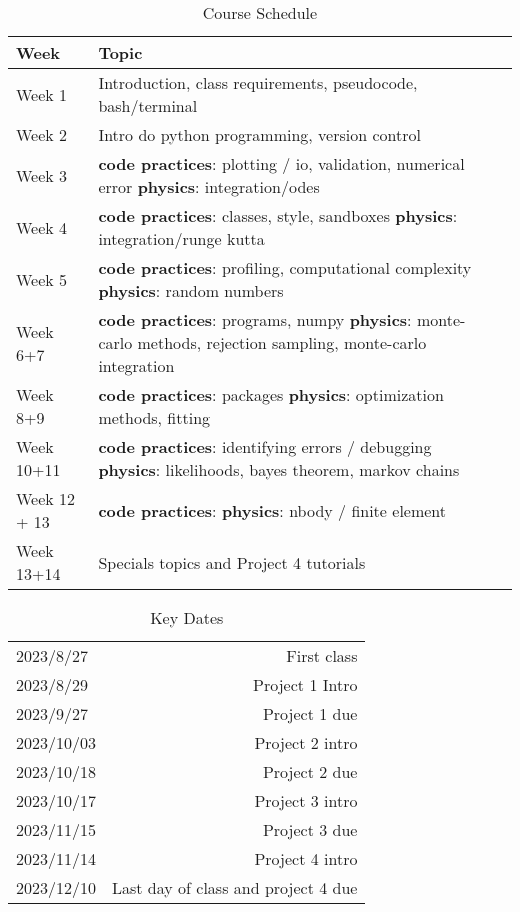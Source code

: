 \documentclass[12pt]{article}
\begin{document}
\begin{table}[h]
  \caption{Course Schedule}
\begin{center}
  \begin{tabular}{|p{3cm}|m{10cm} | @{}m{0pt}@{}}
     \toprule
     \textbf{Week} & \textbf{Topic} \\\hline
    Week 1 & Introduction, class requirements, pseudocode, bash/terminal \\ \hline
    Week 2 & Intro do python programming, version control \\
    Week 3 & \textbf{code practices}: plotting / io, validation, numerical error \textbf{physics}: integration/odes \\\hline
    Week 4 & \textbf{code practices}: classes, style, sandboxes \textbf{physics}: integration/runge kutta \\\hline
    Week 5 & \textbf{code practices}: profiling, computational complexity \textbf{physics}: random numbers \\\hline
    Week 6+7 & \textbf{code practices}: programs, numpy \textbf{physics}: monte-carlo methods, rejection sampling, monte-carlo integration \\\hline
    Week 8+9 & \textbf{code practices}: packages \textbf{physics}: optimization methods, fitting \\\hline
    Week 10+11 & \textbf{code practices}: identifying errors / debugging \textbf{physics}: likelihoods, bayes theorem, markov chains \\\hline
    Week 12 + 13 & \textbf{code practices}: \textbf{physics}: nbody / finite element \\\hline
    Week 13+14 & Specials topics and Project 4 tutorials \\
    \bottomrule
  \end{tabular}
\end{center}
\end{table}

\begin{table}[h]
  \caption{Key Dates}
\begin{center}
  \begin{tabular}{l|r}
    \toprule
    2023/8/27 & First class \\
    2023/8/29 & Project 1 Intro \\
    2023/9/27 & Project 1 due \\
    2023/10/03 & Project 2 intro \\
    2023/10/18 & Project 2 due \\
    2023/10/17 & Project 3 intro \\
    2023/11/15 & Project 3 due \\
    2023/11/14 & Project 4 intro \\
    2023/12/10 & Last day of class and project 4 due \\
    \bottomrule
  \end{tabular}
\end{center}
\end{table}
\end{document}
